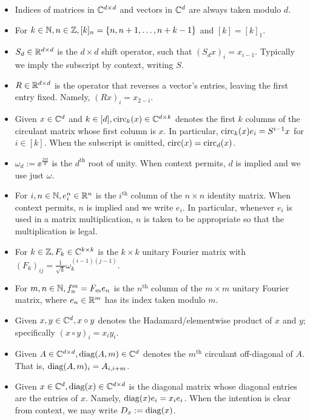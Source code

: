 \begin{itemize}
\item Indices of matrices in $\mathbb{C}^{d \times d}$ and vectors in $\mathbb{C}^d$ are always taken modulo $d$.
\item For $k \in \mathbb{N}, n \in \mathbb{Z}, [k]_n = \{n, n + 1, \ldots, n + k - 1\}$ and $[k] = [k]_1$.
\item $S_d \in \mathbb{R}^{d \times d}$ is the $d \times d$ shift operator, such that $(S_d x)_i = x_{i - 1}$.  Typically we imply the subscript by context, writing $S$.
\item $R \in \mathbb{R}^{d \times d}$ is the operator that reverses a vector's entries, leaving the first entry fixed.  Namely, $(R x)_i = x_{2 - i}$.
\item Given $x \in \mathbb{C}^d$ and $k \in [d], \operatorname{circ}_k(x) \in \mathbb{C}^{d \times k}$ denotes the first $k$ columns of the circulant matrix whose first column is $x$.  In particular, $\operatorname{circ}_k(x) e_i = S^{i - 1} x$ for $i \in [k]$.  When the subscript is omitted, $\operatorname{circ}(x) = \operatorname{circ}_d(x)$.
\item $\omega_d := \ee^{\frac{2 \pi \ii}{d}}$ is the $d^{\text{th}}$ root of unity.  When context permits, $d$ is implied and we use just $\omega$.
  \item For $i, n \in \mathbb{N}, e_i^n \in \mathbb{R}^n$ is the $i^{\text{th}}$ column of the $n \times n$ identity matrix.  When context permits, $n$ is implied and we write $e_i$.  In particular, whenever $e_i$ is used in a matrix multiplication, $n$ is taken to be appropriate so that the multiplication is legal.
\item For $k \in \mathbb{Z}, F_k \in \mathbb{C}^{k \times k}$ is the $k \times k$ unitary Fourier matrix with $(F_k)_{ij} = \frac{1}{\sqrt{k}} \omega_k^{(i-1)(j-1)}$.
  \item For $m, n \in \mathbb{N}, f_n^m = F_m e_n$ is the $n^{\text{th}}$ column of the $m \times m$ unitary Fourier matrix, where $e_n \in \mathbb{R}^m$ has its index taken modulo $m$.
\item Given $x, y \in \mathbb{C}^d, x \circ y$ denotes the Hadamard/elementwise product of $x$ and $y$; specifically $(x \circ y)_i = x_i y_i$.
\item Given $A \in \mathbb{C}^{d \times d}, \operatorname{diag}(A, m) \in \mathbb{C}^d$ denotes the $m^{\text{th}}$ circulant off-diagonal of $A$.  That is, $\operatorname{diag}(A, m)_i = A_{i, i + m}$.
  \item Given $x \in \mathbb{C}^d, \operatorname{diag}(x) \in \mathbb{C}^{d \times d}$ is the diagonal matrix whose diagonal entries are the entries of $x$.  Namely, $\operatorname{diag}(x) e_i = x_i e_i$.  When the intention is clear from context, we may write $D_x := \operatorname{diag}(x)$.

\end{itemize}
